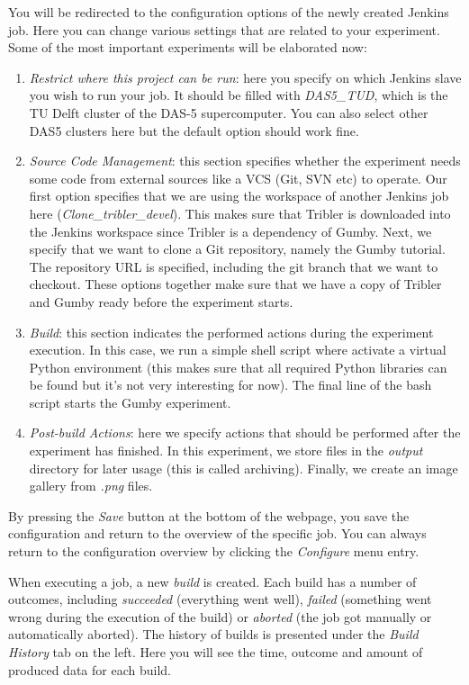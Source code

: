 \documentclass{article}
\begin{document}
You will be redirected to the configuration options of the newly created Jenkins job.
Here you can change various settings that are related to your experiment.
Some of the most important experiments will be elaborated now:

\begin{enumerate}
	\item \emph{Restrict where this project can be run}: here you specify on which Jenkins slave you wish to run your job. It should be filled with \emph{DAS5\_TUD}, which is the TU Delft cluster of the DAS-5 supercomputer. You can also select other DAS5 clusters here but the default option should work fine.
	\item \emph{Source Code Management}: this section specifies whether the experiment needs some code from external sources like a VCS (Git, SVN etc) to operate. Our first option specifies that we are using the workspace of another Jenkins job here (\emph{Clone\_tribler\_devel}). This makes sure that Tribler is downloaded into the Jenkins workspace since Tribler is a dependency of Gumby. Next, we specify that we want to clone a Git repository, namely the Gumby tutorial. The repository URL is specified, including the git branch that we want to checkout. These options together make sure that we have a copy of Tribler and Gumby ready before the experiment starts.
	\item \emph{Build}: this section indicates the performed actions during the experiment execution. In this case, we run a simple shell script where activate a virtual Python environment (this makes sure that all required Python libraries can be found but it's not very interesting for now). The final line of the bash script starts the Gumby experiment.
	\item \emph{Post-build Actions}: here we specify actions that should be performed after the experiment has finished. In this experiment, we store files in the \emph{output} directory for later usage (this is called archiving). Finally, we create an image gallery from \emph{.png} files.
\end{enumerate}

By pressing the \emph{Save} button at the bottom of the webpage, you save the configuration and return to the overview of the specific job.
You can always return to the configuration overview by clicking the \emph{Configure} menu entry.

When executing a job, a new \emph{build} is created.
Each build has a number of outcomes, including \emph{succeeded} (everything went well), \emph{failed} (something went wrong during the execution of the build) or \emph{aborted} (the job got manually or automatically aborted).
The history of builds is presented under the \emph{Build History} tab on the left.
Here you will see the time, outcome and amount of produced data for each build.
\end{document}
